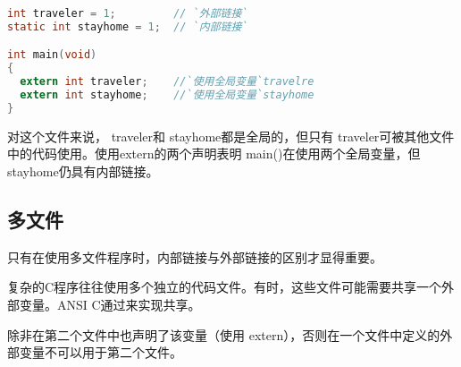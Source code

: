 \begin{frame}[fragile]\ft{\subsecname}
\begin{lstlisting}[language=c,frame=single]
int traveler = 1;         // `外部链接`
static int stayhome = 1;  // `内部链接`

int main(void)
{
  extern int traveler;    //`使用全局变量`travelre
  extern int stayhome;    //`使用全局变量`stayhome
}
\end{lstlisting}   \pause
对这个文件来说，{ traveler}和{ stayhome}都是全局的，但只有{ traveler}可被其他文件中的代码使用。使用extern的两个声明表明{ main()}在使用两个全局变量，但{ stayhome}仍具有内部链接。
\end{frame}


\subsection{多文件}
\begin{frame}\ft{\subsecname}
  只有在使用多文件程序时，内部链接与外部链接的区别才显得重要。
\end{frame}

\begin{frame}\ft{\subsecname}
  复杂的C程序往往使用多个独立的代码文件。有时，这些文件可能需要共享一个外部变量。ANSI C通过来实现共享。

\end{frame}

\begin{frame}\ft{\subsecname}
除非在第二个文件中也声明了该变量（使用{ extern}），否则在一个文件中定义的外部变量不可以用于第二个文件。
\end{frame}